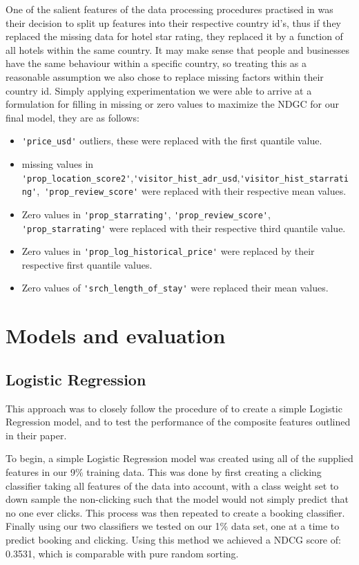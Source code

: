 \documentclass{llncs}
\begin{document}
	One of the salient features of the data processing procedures practised in \cite{DBLP:journals/corr/LiuXZYPLSW13} was their decision to split up features into their respective country id's, thus if they replaced the missing data for hotel star rating, they replaced it by a function of all hotels within the same country. It may make sense that people and businesses have the same behaviour within a specific country, so treating this as a reasonable assumption we also chose to replace missing factors within their country id. Simply applying experimentation we were able to arrive at a formulation for filling in missing or zero values to maximize the NDGC for our final model, they are as follows:
	\begin{itemize}
	\item \verb!'price_usd'! outliers, these were replaced with the first quantile value.
	\item missing values in \verb!'prop_location_score2'!,\verb!'visitor_hist_adr_usd!,\verb!'visitor_hist_starrating'!,\ \verb!'prop_review_score'! were replaced with their respective mean values. 
	\item Zero values in \verb!'prop_starrating'!, \verb!'prop_review_score'!, \verb!'prop_starrating'! were replaced with their respective third quantile value.
	\item Zero values in \verb!'prop_log_historical_price'! were replaced by their respective first quantile values. 
	\item Zero values of \verb!'srch_length_of_stay'! were replaced their mean values.
	\end{itemize}



\section{Models and evaluation}



\subsection{Logistic Regression}

This approach was to closely follow the procedure of \cite{DBLP:journals/corr/LiuXZYPLSW13} to create a simple Logistic Regression model, and to test the performance of the composite features outlined in their paper.

To begin, a simple Logistic Regression model was created using all of the supplied features in our 9\% training data. This was done by first creating a clicking classifier taking all features of the data into account, with a class weight set to down sample the non-clicking such that the model would not simply predict that no one ever clicks. This process was then repeated to create a booking classifier.
Finally using our two classifiers we tested on our 1\% data set, one at a time to predict booking and clicking. Using this method we achieved a NDCG score of: 0.3531, which is comparable with pure random sorting.
\end{document}
